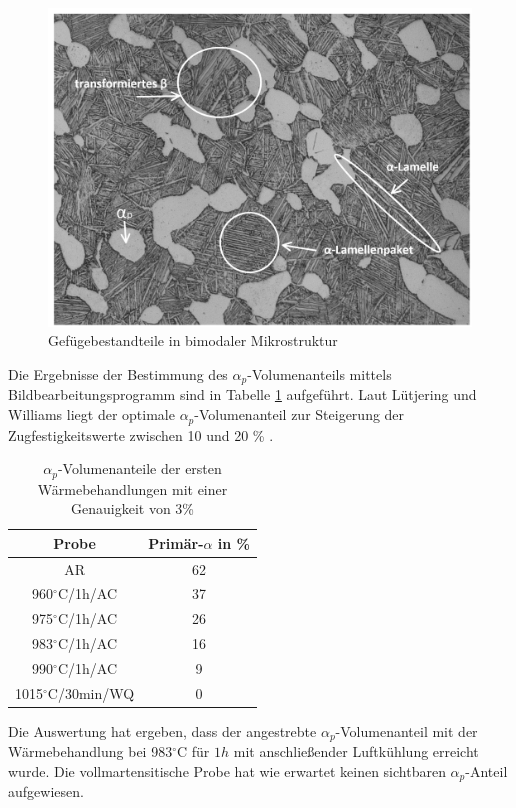 \begin{figure}
	\centering
	\includegraphics[width=0.9\linewidth]{./Bilder/Abbildung 20}
	\caption[Abbildung 20]{Gefügebestandteile in bimodaler Mikrostruktur}
	\label{fig:abbildung-20}
\end{figure}

Die Ergebnisse der Bestimmung des $\alpha_p$-Volumenanteils mittels Bildbearbeitungsprogramm sind in Tabelle \ref{Tabelle 4} aufgeführt. Laut Lütjering und Williams liegt der optimale $\alpha_p$-Volumenanteil zur Steigerung der Zugfestigkeitswerte zwischen 10 und 20 \% \cite{Lutjering.2007}.

\begin{table}
	\centering
	\begin{tabular}{|c|c|}
		\hline 
		Probe & Primär-$\alpha$ in \% \\ 
		\hline 
		AR & 62 \\ 
		\hline 
		960$^\circ$C/1h/AC & 37 \\ 
		\hline 
		975$^\circ$C/1h/AC & 26 \\ 
		\hline 
		983$^\circ$C/1h/AC & 16 \\ 
		\hline 
		990$^\circ$C/1h/AC & 9 \\ 
		\hline 
		1015$^\circ$C/30min/WQ & 0 \\ 
		\hline 
	\end{tabular} 
	\caption{$\alpha_p$-Volumenanteile der ersten Wärmebehandlungen mit einer Genauigkeit von 3\%}
	\label{Tabelle 4}
\end{table}

Die Auswertung hat ergeben, dass der angestrebte $\alpha_p$-Volumenanteil mit der Wärmebehandlung bei 983$^\circ$C für $1 h$ mit anschließender Luftkühlung erreicht wurde. Die vollmartensitische Probe hat wie erwartet keinen sichtbaren $\alpha_p$-Anteil aufgewiesen.

